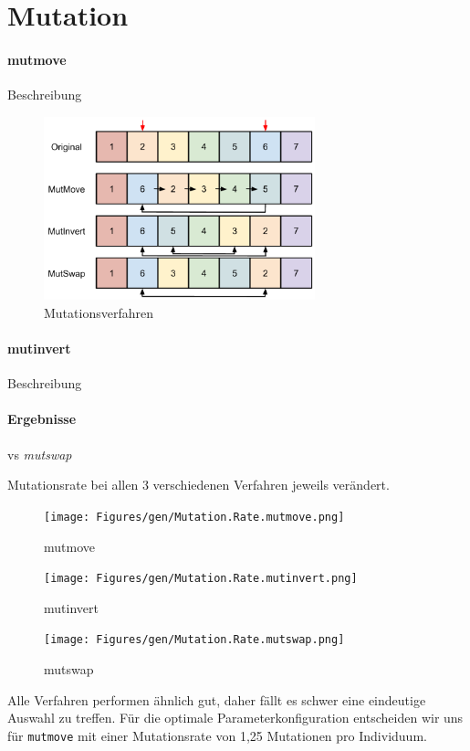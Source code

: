 \section{Mutation}\label{mutation}


\paragraph{mutmove}
Beschreibung

\begin{figure}[h!]
  \centering
  \includegraphics[width=0.7\textwidth]{Figures/mutation.pdf}
  \caption{Mutationsverfahren}\label{fig.mutation}
\end{figure}

\paragraph{mutinvert}
Beschreibung

\paragraph{Ergebnisse}
vs \emph{mutswap}

Mutationsrate bei allen 3 verschiedenen Verfahren jeweils verändert.









\begin{figure}[!h]
  \texttt{[image: Figures/gen/Mutation.Rate.mutmove.png]}
  \caption{mutmove}\label{fig:mutmove}
\endminipage\hfill
{}
  \texttt{[image: Figures/gen/Mutation.Rate.mutinvert.png]}
  \caption{mutinvert}\label{fig:mutinvert}
\endminipage\hfill
{}%
  \texttt{[image: Figures/gen/Mutation.Rate.mutswap.png]}
  \caption{mutswap}\label{fig:mutswap}
\endminipage
\end{figure}

Alle Verfahren performen ähnlich gut, daher fällt es schwer eine eindeutige
Auswahl zu treffen.
Für die optimale Parameterkonfiguration entscheiden wir uns für
{\tt mutmove} mit einer Mutationsrate von 1,25 Mutationen pro Individuum.
